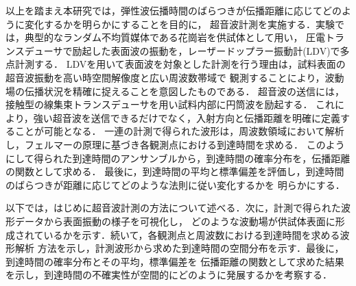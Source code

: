 以上を踏まえ本研究では，弾性波伝播時間のばらつきが伝播距離に応じてどのように変化するかを明らかにすることを目的に，
超音波計測を実施する．実験では，典型的なランダム不均質媒体である花崗岩を供試体として用い，
圧電トランスデューサで励起した表面波の振動を，レーザードップラー振動計(LDV)で多点計測する．
LDVを用いて表面波を対象とした計測を行う理由は，試料表面の超音波振動を高い時空間解像度と広い周波数帯域で
観測することにより，波動場の伝播状況を精確に捉えることを意図したものである．
超音波の送信には，接触型の線集束トランスデューサを用い試料内部に円筒波を励起する．
これにより，強い超音波を送信できるだけでなく，入射方向と伝播距離を明確に定義することが可能となる．
一連の計測で得られた波形は，周波数領域において解析し，フェルマーの原理に基づき各観測点における到達時間を求める．
このようにして得られた到達時間のアンサンブルから，到達時間の確率分布を，伝播距離の関数として求める．
最後に，到達時間の平均と標準偏差を評価し，到達時間のばらつきが距離に応じてどのような法則に従い変化するかを
明らかにする．

以下では，はじめに超音波計測の方法について述べる．次に，計測で得られた波形データから表面振動の様子を可視化し，
どのような波動場が供試体表面に形成されているかを示す．続いて，各観測点と周波数における到達時間を求める波形解析
方法を示し，計測波形から求めた到達時間の空間分布を示す．最後に，到達時間の確率分布とその平均，標準偏差を
伝播距離の関数として求めた結果を示し，到達時間の不確実性が空間的にどのように発展するかを考察する．
